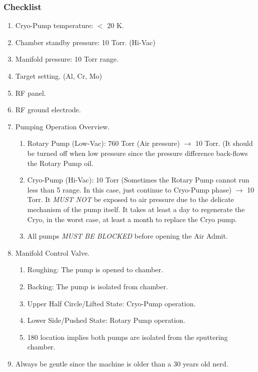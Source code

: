 \subsubsection{Checklist}
\begin{enumerate}
\item Cryo-Pump temperature: $<$ 20 K.
\item Chamber standby pressure: 10 Torr. (Hi-Vac)
\item Manifold pressure: 10 Torr range.
\item Target setting. (Al, Cr, Mo)
\item RF panel.
\item RF ground electrode.
\item Pumping Operation Overview.
  \begin{enumerate}
  \item Rotary Pump (Low-Vac): 760 Torr (Air pressure) $\rightarrow$ 10 Torr. (It should be turned off when low pressure since the pressure difference back-flows the Rotary Pump oil.
  \item Cryo-Pump (Hi-Vac): 10 Torr (Sometimes the Rotary Pump cannot run less than 5 range. In this case, just continue to Cryo-Pump phase) $\rightarrow$ 10 Torr. It \emph{MUST NOT} be exposed to air pressure due to the delicate mechanism of the pump itself. It takes at least a day to regenerate the Cryo, in the worst case, at least a month to replace the Cryo pump.
  \item All pumps \emph{MUST BE BLOCKED} before opening the Air Admit.
  \end{enumerate}
\item Manifold Control Valve.
  \begin{enumerate}
  \item Roughing: The pump is opened to chamber.
  \item Backing: The pump is isolated from chamber.
  \item Upper Half Circle/Lifted State: Cryo-Pump operation.
  \item Lower Side/Pushed State: Rotary Pump operation.
  \item 180 location implies both pumps are isolated from the sputtering chamber.
  \end{enumerate}
\item Always be gentle since the machine is older than a 30 years old nerd.
\end{enumerate}

